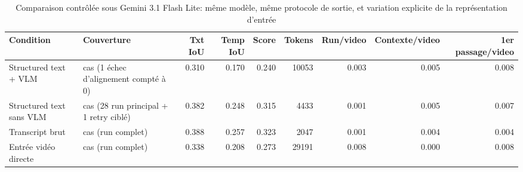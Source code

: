 \begin{table}[ht]
\centering
\scriptsize
\caption{Comparaison contr\^ol\'ee sous Gemini 3.1 Flash Lite: m\^eme mod\`ele, m\^eme protocole de sortie, et variation explicite de la repr\'esentation d'entr\'ee}
\label{tab:controlled-gemini-ablation}
\begin{tabularx}{\textwidth}{>{\raggedright\arraybackslash}p{}>{\raggedright\arraybackslash}p{}rrrrrrr}
\toprule
Condition & Couverture & Txt IoU & Temp IoU & Score & Tokens & Run/video & Contexte/video & 1er passage/video \\
\midrule
Structured text + VLM & 29 cas (1 échec d'alignement compté à 0) & 0.310 & 0.170 & 0.240 & 10053 & 0.003 & 0.005 & 0.008 \\
Structured text sans VLM & 29 cas (28 run principal + 1 retry ciblé) & 0.382 & 0.248 & 0.315 & 4433 & 0.001 & 0.005 & 0.007 \\
Transcript brut & 29 cas (run complet) & 0.388 & 0.257 & 0.323 & 2047 & 0.001 & 0.004 & 0.004 \\
Entrée vidéo directe & 29 cas (run complet) & 0.338 & 0.208 & 0.273 & 29191 & 0.008 & 0.000 & 0.008 \\
\bottomrule
\end{tabularx}
\end{table}

